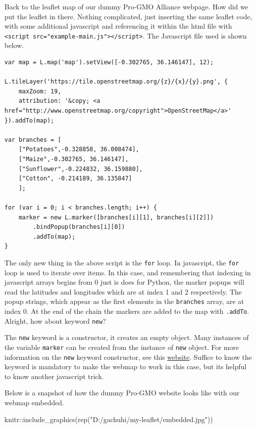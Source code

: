 \documentclass[
]{book}
\newenvironment{Shaded}{\begin{snugshade}}{\end{snugshade}}
\newcommand{\FunctionTok}[1]{\textcolor[rgb]{0.00,0.00,0.00}{#1}}
\newcommand{\NormalTok}[1]{#1}
\newcommand{\SpecialCharTok}[1]{\textcolor[rgb]{0.00,0.00,0.00}{#1}}
\newcommand{\StringTok}[1]{\textcolor[rgb]{0.31,0.60,0.02}{#1}}
\theoremstyle{definition}
\theoremstyle{definition}
\theoremstyle{definition}
\theoremstyle{definition}
\theoremstyle{remark}
\begin{document}
Back to the leaflet map of our dummy Pro-GMO Alliance webpage. How did we put the leaflet in there. Nothing complicated, just inserting the same leaflet code, with some additional javascript and referencing it within the html file with \texttt{\textless{}script\ src="example-main.js"\textgreater{}\textless{}/script\textgreater{}}. The Javascript file used is shown below.

\begin{verbatim}
var map = L.map('map').setView([-0.302765, 36.146147], 12);

L.tileLayer('https://tile.openstreetmap.org/{z}/{x}/{y}.png', {
    maxZoom: 19,
    attribution: '&copy; <a href="http://www.openstreetmap.org/copyright">OpenStreetMap</a>'
}).addTo(map);

var branches = [
    ["Potatoes",-0.328858, 36.008474],
    ["Maize",-0.302765, 36.146147],
    ["Sunflower",-0.224832, 36.159880],
    ["Cotton", -0.214189, 36.135847]
    ];

for (var i = 0; i < branches.length; i++) {
    marker = new L.marker([branches[i][1], branches[i][2]])
        .bindPopup(branches[i][0])
        .addTo(map);
}
\end{verbatim}

The only new thing in the above script is the \texttt{for} loop. In javascript, the \texttt{for} loop is used to iterate over items. In this case, and remembering that indexing in javascript arrays begins from 0 just is does for Python, the marker popups will read the latitudes and longitudes which are at index 1 and 2 respectively. The popup strings, which appear as the first elements in the \texttt{branches} array, are at index 0. At the end of the chain the markers are added to the map with \texttt{.addTo}. Alright, how about keyword \texttt{new}?

The \texttt{new} keyword is a constructor, it creates an empty object. Many instances of the variable \texttt{marker} can be created from the instance of \texttt{new} object. For more information on the \texttt{new} keyword constructor, see this \href{https://www.programiz.com/javascript/constructor-function}{website}. Suffice to know the keyword is mandatory to make the webmap to work in this case, but its helpful to know another javascript trick.

Below is a snapshot of how the dummy Pro-GMO website looks like with our webmap embedded.

\begin{Shaded}
\begin{Highlighting}[]
\NormalTok{knitr}\SpecialCharTok{::}\FunctionTok{include\_graphics}\NormalTok{(}\FunctionTok{rep}\NormalTok{(}\StringTok{"D:/gachuhi/my{-}leaflet/embedded.jpg"}\NormalTok{))}
\end{Highlighting}
\end{Shaded}
\end{document}
